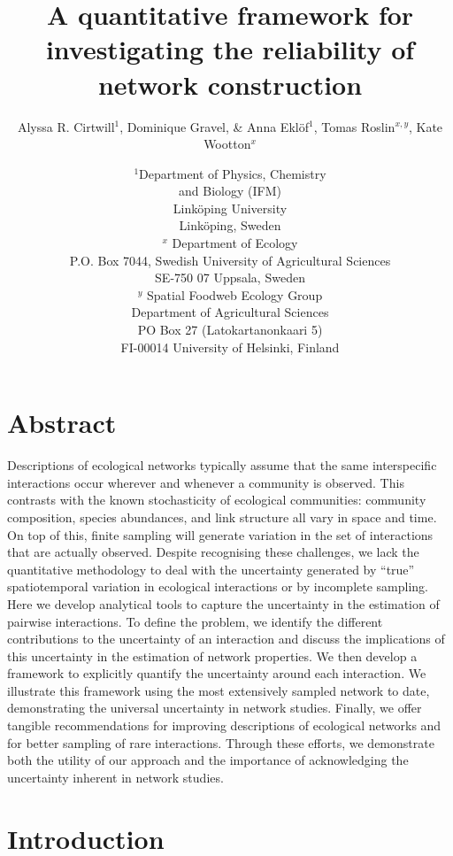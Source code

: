\documentclass[12pt]{article}
\title{A quantitative framework for investigating the reliability of network construction}
\author{Alyssa R. Cirtwill$^{1}$, Dominique Gravel, \&  Anna Ekl\"{o}f$^{1}$, Tomas Roslin$^{x,y}$, Kate Wootton$^{x}$}
\date{\small$^1$Department of Physics, Chemistry\\ 
and Biology (IFM)\\ 
Link\"{o}ping University\\
Link\"{o}ping, Sweden\\
\medskip $^x$ Department of Ecology\\ P.O. Box 7044, Swedish University of Agricultural Sciences \\ SE-750 07 Uppsala, Sweden \\
\medskip $^y$ Spatial Foodweb Ecology Group\\ Department of Agricultural Sciences \\ PO Box 27 (Latokartanonkaari 5)\\ FI-00014 University of Helsinki, Finland \\
}
\begin{document}
 
\maketitle 
\raggedright
\setlength{\parindent}{15pt} 


\section*{Abstract}

  Descriptions of ecological networks typically assume that the same interspecific interactions occur wherever and whenever a community is observed. This contrasts with the known stochasticity of ecological communities: community composition, species abundances, and link structure all vary in space and time. On top of this, finite sampling will generate variation in the set of interactions that are actually observed. Despite recognising these challenges, we lack the quantitative methodology to deal with the uncertainty generated by “true” spatiotemporal variation in ecological interactions or by incomplete sampling. Here we develop analytical tools to capture the uncertainty in the estimation of pairwise interactions. To define the problem, we identify the different contributions to the uncertainty of an interaction and discuss the implications of this uncertainty in the estimation of network properties. We then develop a framework to explicitly quantify the uncertainty around each interaction. We illustrate this framework using the most extensively sampled network to date, demonstrating the universal uncertainty in network studies. Finally, we offer tangible recommendations for improving descriptions of ecological networks and for better sampling of rare interactions. Through these efforts, we demonstrate both the utility of our approach and the importance of acknowledging the uncertainty inherent in network studies.


\section*{Introduction}
\end{document}
